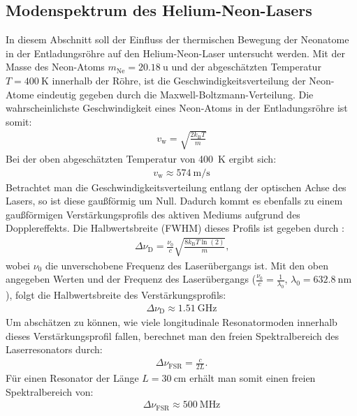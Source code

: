 \documentclass[11pt, a4paper]{article}
\numberwithin{equation}{section}
\begin{document}
\subsection{Modenspektrum des Helium-Neon-Lasers}
In diesem Abschnitt soll der Einfluss der thermischen Bewegung der Neonatome in der Entladungsröhre auf den Helium-Neon-Laser untersucht werden.
Mit der Masse des Neon-Atoms $m_\mathrm{Ne} = \SI{20.18}{\atomicmassunit}$ \cite{iupac_periodic_table} und der abgeschätzten Temperatur $T = \SI{400}{\kelvin}$ innerhalb der Röhre, ist die Geschwindigkeitsverteilung der Neon-Atome eindeutig gegeben durch die Maxwell-Boltzmann-Verteilung.
Die wahrscheinlichste Geschwindigkeit eines Neon-Atoms in der Entladungsröhre ist somit:
\begin{align}
	v_\mathrm{w} = \sqrt{\frac{2 k_\mathrm{B} T}{m}}
\end{align}
Bei der oben abgeschätzten Temperatur von \SI{400}{\kelvin} ergibt sich:
\begin{align}
	v_\mathrm{w} \approx \SI{574}{\metre\per\second}
\end{align}
Betrachtet man die Geschwindigkeitsverteilung entlang der optischen Achse des Lasers, so ist diese gaußförmig um Null.
Dadurch kommt es ebenfalls zu einem gaußförmigen Verstärkungsprofils des aktiven Mediums aufgrund des Dopplereffekts.
Die Halbwertsbreite (FWHM) dieses Profils ist gegeben durch \cite{meschede}:
\begin{align}
	\Delta \nu_\mathrm{D} = \frac{\nu_0}{c} \sqrt{\frac{8 k_\mathrm{B} T \ln(2)}{m}} \text{,}
\end{align}
wobei $\nu_0$ die unverschobene Frequenz des Laserübergangs ist.
Mit den oben angegeben Werten und der Frequenz des Laserübergangs ($\frac{\nu_0}{c} = \frac{1}{\lambda_0}$, $\lambda_0 = \SI{632.8}{\nano\metre}$), folgt die Halbwertsbreite des Verstärkungsprofils:
\begin{align}
	\Delta \nu_\mathrm{D} \approx \SI{1.51}{\giga\hertz}
\end{align}
Um abschätzen zu können, wie viele longitudinale Resonatormoden innerhalb dieses Verstärkungsprofil fallen, berechnet man den freien Spektralbereich des Laserresonators durch:
\begin{align}
	\Delta \nu_\mathrm{FSR} = \frac{c}{2 L} \text{.}
\end{align}
Für einen Resonator der Länge $L = \SI{30}{\centi\metre}$ erhält man somit einen freien Spektralbereich von:
\begin{align}
	\Delta \nu_\mathrm{FSR} \approx \SI{500}{\mega\hertz}
\end{align}
\end{document}
